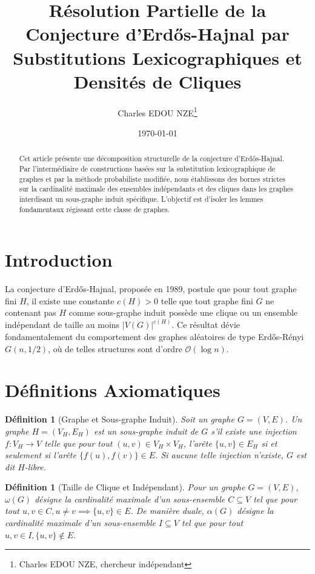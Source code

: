 \documentclass[11pt, a4paper]{article}
\title{Résolution Partielle de la Conjecture d'Erdős-Hajnal par Substitutions Lexicographiques et Densités de Cliques}
\author{Charles EDOU NZE\thanks{Charles EDOU NZE, chercheur indépendant}}
\date{\today}
\newtheorem{definition}[theorem]{Définition}
\begin{document}
\maketitle

\begin{abstract}
Cet article présente une décomposition structurelle de la conjecture d'Erdős-Hajnal. Par l'intermédiaire de constructions basées sur la substitution lexicographique de graphes et par la méthode probabiliste modifiée, nous établissons des bornes strictes sur la cardinalité maximale des ensembles indépendants et des cliques dans les graphes interdisant un sous-graphe induit spécifique. L'objectif est d'isoler les lemmes fondamentaux régissant cette classe de graphes.
\end{abstract}

\section{Introduction}

La conjecture d'Erdős-Hajnal, proposée en 1989, postule que pour tout graphe fini $H$, il existe une constante $c(H) > 0$ telle que tout graphe fini $G$ ne contenant pas $H$ comme sous-graphe induit possède une clique ou un ensemble indépendant de taille au moins $|V(G)|^{c(H)}$.
Ce résultat dévie fondamentalement du comportement des graphes aléatoires de type Erdős-Rényi $G(n, 1/2)$, où de telles structures sont d'ordre $\mathcal{O}(\log n)$.

\section{Définitions Axiomatiques}

\begin{definition}[Graphe et Sous-graphe Induit]
Soit un graphe $G = (V, E)$. Un graphe $H = (V_H, E_H)$ est un sous-graphe induit de $G$ s'il existe une injection $f : V_H \to V$ telle que pour tout $(u, v) \in V_H \times V_H$, l'arête $\{u, v\} \in E_H$ si et seulement si l'arête $\{f(u), f(v)\} \in E$. Si aucune telle injection n'existe, $G$ est dit $H$-libre.
\end{definition}

\begin{definition}[Taille de Clique et Indépendant]
Pour un graphe $G = (V, E)$, $\omega(G)$ désigne la cardinalité maximale d'un sous-ensemble $C \subseteq V$ tel que pour tout $u, v \in C, u \neq v \implies \{u, v\} \in E$.
De manière duale, $\alpha(G)$ désigne la cardinalité maximale d'un sous-ensemble $I \subseteq V$ tel que pour tout $u, v \in I, \{u, v\} \notin E$.
\end{definition}
\end{document}
